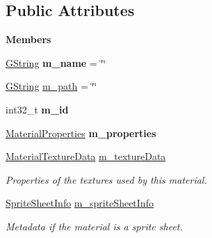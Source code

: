 \subsection*{Public Attributes}
\begin{Indent}\textbf{ Members}\par
\begin{DoxyCompactItemize}
\item 
\mbox{\label{structrev_1_1_material_data_ae02dd4fd097e8071a53c7cd8e4ad98ba}} 
\mbox{\hyperlink{classrev_1_1_g_string}{G\+String}} {\bfseries m\+\_\+name} = \char`\"{}\char`\"{}
\item 
\mbox{\hyperlink{classrev_1_1_g_string}{G\+String}} \mbox{\hyperlink{structrev_1_1_material_data_ac54dbbf36395be2c78d641d06c3df440}{m\+\_\+path}} = \char`\"{}\char`\"{}
\item 
\mbox{\label{structrev_1_1_material_data_a842fee758d0b1ecb3408b2664512f245}} 
int32\+\_\+t {\bfseries m\+\_\+id}
\item 
\mbox{\label{structrev_1_1_material_data_a14d380bfb9b8a5d9d5c4db8e7b9c5743}} 
\mbox{\hyperlink{structrev_1_1_material_properties}{Material\+Properties}} {\bfseries m\+\_\+properties}
\item 
\mbox{\label{structrev_1_1_material_data_af060a198bc19ae3c58c767457264c8d6}} 
\mbox{\hyperlink{structrev_1_1_material_texture_data}{Material\+Texture\+Data}} \mbox{\hyperlink{structrev_1_1_material_data_af060a198bc19ae3c58c767457264c8d6}{m\+\_\+texture\+Data}}
\begin{DoxyCompactList}\small\item\em Properties of the textures used by this material. \end{DoxyCompactList}\item 
\mbox{\label{structrev_1_1_material_data_a1ce66383017e18fcb8b7c8b0a6a09841}} 
\mbox{\hyperlink{structrev_1_1_sprite_sheet_info}{Sprite\+Sheet\+Info}} \mbox{\hyperlink{structrev_1_1_material_data_a1ce66383017e18fcb8b7c8b0a6a09841}{m\+\_\+sprite\+Sheet\+Info}}
\begin{DoxyCompactList}\small\item\em Metadata if the material is a sprite sheet. \end{DoxyCompactList}\end{DoxyCompactItemize}
\end{Indent}



